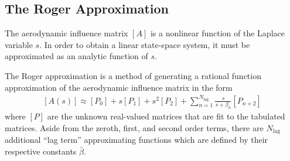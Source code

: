 \subsection{The Roger Approximation}

The aerodynamic influence matrix $[A]$ is a nonlinear function of the Laplace variable $s$. In order to obtain a linear state-space system, it must be approximated as an analytic function of $s$.

The Roger approximation \cite{Roger1977} is a method of generating a rational function approximation of the aerodynamic influence matrix in the form
\begin{align}
	\label{eq:RogerApprox}
    [A(s)] \approx [P_0] + s [P_1] + s^2 [P_2] + \sum_{n=1}^{N_\text{lag}} \frac{s}{s+\beta_n} [P_{n+2}]
\end{align}
where $[P]$ are the unknown real-valued matrices that are fit to the tabulated matrices. Aside from the zeroth, first, and second order terms, there are $N_\text{lag}$ additional ``lag term'' approximating functions which are defined by their respective constants $\bar{\beta}$.

